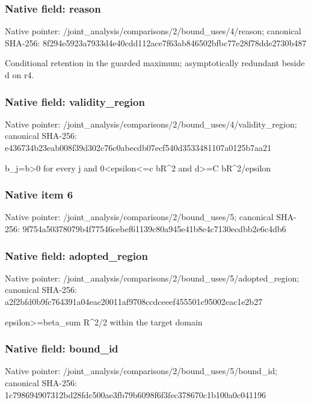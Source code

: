 \documentclass[10pt,a4paper]{article}
\begin{document}
\subsubsection{Native field: reason}
Native pointer: /joint\_\allowbreak{}analysis/comparisons/2/bound\_\allowbreak{}uses/4/reason; canonical SHA-256: 8f294e5923a7933d4e40cdd112ace7f63ab846502bfbc77e28f78dde2730b487

\begingroup\raggedright\sloppy Conditional retention in the guarded maximum;\allowbreak{} asymptotically redundant beside d on r4.\par\endgroup

\subsubsection{Native field: validity\_\allowbreak{}region}
Native pointer: /joint\_\allowbreak{}analysis/comparisons/2/bound\_\allowbreak{}uses/4/validity\_\allowbreak{}region; canonical SHA-256: e436734b23eab008f39d302c76c0abecdb07ecf540d3533481107a0125b7aa21

\begingroup\raggedright\sloppy b\_\allowbreak{}j=\allowbreak{}b>0 for every j and 0<epsilon<=\allowbreak{}c bR\textasciicircum{}2 and d>=\allowbreak{}C bR\textasciicircum{}2/\allowbreak{}epsilon\par\endgroup

\subsubsection{Native item 6}
Native pointer: /joint\_\allowbreak{}analysis/comparisons/2/bound\_\allowbreak{}uses/5; canonical SHA-256: 9f754a50378079b4f77546cebef61139c80a945e41b8e4c7130ecdbb2e6c4db6

\subsubsection{Native field: adopted\_\allowbreak{}region}
Native pointer: /joint\_\allowbreak{}analysis/comparisons/2/bound\_\allowbreak{}uses/5/adopted\_\allowbreak{}region; canonical SHA-256: a2f2bfd0b9fc764391a04eac20011af9708ccdceeef455501c95002eac1e2b27

\begingroup\raggedright\sloppy epsilon>=\allowbreak{}beta\_\allowbreak{}sum R\textasciicircum{}2/\allowbreak{}2 within the target domain\par\endgroup

\subsubsection{Native field: bound\_\allowbreak{}id}
Native pointer: /joint\_\allowbreak{}analysis/comparisons/2/bound\_\allowbreak{}uses/5/bound\_\allowbreak{}id; canonical SHA-256: 1c798694907312bd28fdc500ae3fb79b6098f6f3fec378670c1b100a0c041196
\end{document}
